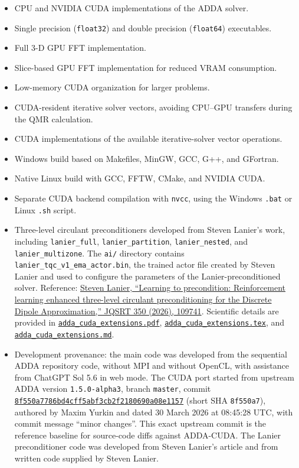 \documentclass[11pt,a4paper]{article}
\newcommand{\code}[1]{\nolinkurl{#1}}
\begin{document}
\begin{itemize}
  \item CPU and NVIDIA CUDA implementations of the ADDA solver.
  \item Single precision (\code{float32}) and double precision
        (\code{float64}) executables.
  \item Full 3-D GPU FFT implementation.
  \item Slice-based GPU FFT implementation for reduced VRAM consumption.
  \item Low-memory CUDA organization for larger problems.
  \item CUDA-resident iterative solver vectors, avoiding CPU--GPU transfers
        during the QMR calculation.
  \item CUDA implementations of the available iterative-solver vector
        operations.
  \item Windows build based on Makefiles, MinGW, GCC, G++, and GFortran.
  \item Native Linux build with GCC, FFTW, CMake, and NVIDIA CUDA.
  \item Separate CUDA backend compilation with \code{nvcc}, using the Windows
        \code{.bat} or Linux \code{.sh} script.
  \item Three-level circulant preconditioners developed from Steven Lanier's
        work, including \code{lanier_full}, \code{lanier_partition},
        \code{lanier_nested}, and \code{lanier_multizone}. The \code{ai/}
        directory contains \code{lanier_tqc_v1_ema_actor.bin}, the trained
        actor file created by Steven Lanier and used to configure the
        parameters of the Lanier-preconditioned solver. Reference:
        \href{https://doi.org/10.1016/j.jqsrt.2025.109741}{Steven Lanier,
        ``Learning to precondition: Reinforcement learning enhanced three-level
        circulant preconditioning for the Discrete Dipole Approximation,''
        JQSRT 350 (2026), 109741}. Scientific details are provided in
        \href{adda_cuda_extensions.pdf}{\nolinkurl{adda_cuda_extensions.pdf}},
        \href{adda_cuda_extensions.tex}{\nolinkurl{adda_cuda_extensions.tex}},
        and
        \href{adda_cuda_extensions.md}{\nolinkurl{adda_cuda_extensions.md}}.
  \item Development provenance: the main code was developed from the
        sequential ADDA repository code, without MPI and without OpenCL, with
        assistance from ChatGPT Sol 5.6 in web mode. The CUDA port started from
        upstream ADDA version \code{1.5.0-alpha3}, branch \code{master}, commit
        \href{https://github.com/adda-team/adda/commit/8f550a7786bd4cff5abf3cb2f2180690a08e1157}{\code{8f550a7786bd4cff5abf3cb2f2180690a08e1157}}
        (short SHA \code{8f550a7}), authored by Maxim Yurkin and dated
        30 March 2026 at 08:45:28 UTC, with commit message ``minor changes''. This exact upstream commit is the
        reference baseline for source-code diffs against ADDA-CUDA. The Lanier
        preconditioner code was developed from Steven Lanier's article and from
        written code supplied by Steven Lanier.
\end{itemize}
\end{document}
